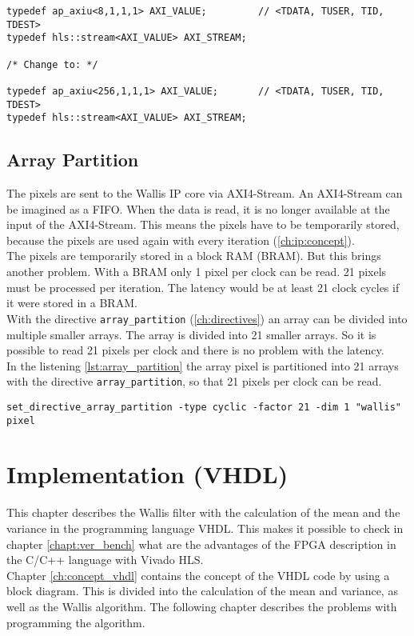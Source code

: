 \begin{minipage}{\textwidth}
\begin{lstlisting}[style=CStyle, caption=Calculation of the division for the Wallis filter, label=lst:division]
typedef ap_axiu<8,1,1,1> AXI_VALUE;			// <TDATA, TUSER, TID, TDEST>
typedef hls::stream<AXI_VALUE> AXI_STREAM;

/* Change to: */

typedef ap_axiu<256,1,1,1> AXI_VALUE;		// <TDATA, TUSER, TID, TDEST>
typedef hls::stream<AXI_VALUE> AXI_STREAM;
\end{lstlisting}
\end{minipage}

\subsection{Array Partition}
The pixels are sent to the Wallis IP core via AXI4-Stream. An AXI4-Stream can be imagined as a FIFO. When the data is read, it is no longer available at the input of the AXI4-Stream. This means the pixels have to be temporarily stored, because the pixels are used again with every iteration (\ref{ch:ip:concept}). \\
The pixels are temporarily stored in a block RAM (BRAM). But this brings another problem. With a BRAM only 1 pixel per clock can be read. 21 pixels must be processed per iteration. The latency would be at least 21 clock cycles if it were stored in a BRAM. \\
With the directive \texttt{array\_partition} (\ref{ch:directives}) an array can be divided into multiple smaller arrays. The array is divided into 21 smaller arrays. So it is possible to read 21 pixels per clock and there is no problem with the latency. \\
In the listening \ref{lst:array_partition} the array pixel is partitioned into 21 arrays with the directive \texttt{array\_partition}, so that 21 pixels per clock can be read. 

\begin{minipage}{\textwidth}
\begin{lstlisting}[style=TextStyle, caption=Set directive array\_partition, label=lst:array_partition]
set_directive_array_partition -type cyclic -factor 21 -dim 1 "wallis" pixel
\end{lstlisting}
\end{minipage}



\section{Implementation (VHDL)} \label{ch:ip:imp_vhdl}
This chapter describes the Wallis filter with the calculation of the mean and the variance in the programming language VHDL. This makes it possible to check in chapter \ref{chapt:ver_bench} what are the advantages of the FPGA description in the C/C++ language with Vivado HLS. \\
Chapter \ref{ch:concept_vhdl} contains the concept of the VHDL code by using a block diagram. This is divided into the calculation of the mean and variance, as well as the Wallis algorithm. The following chapter describes the problems with programming the algorithm.

